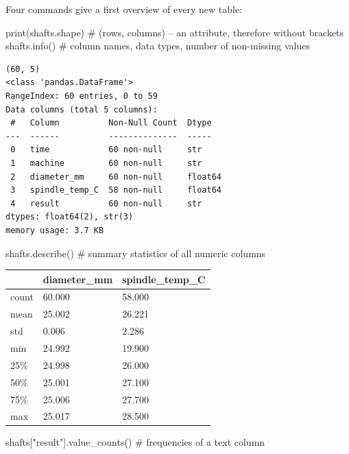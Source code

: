 \documentclass[
  letterpaper,
  DIV=11,
  numbers=noendperiod]{scrreprt}
\newenvironment{Shaded}{\begin{snugshade}}{\end{snugshade}}
\newcommand{\BuiltInTok}[1]{\textcolor[rgb]{0.00,0.23,0.31}{#1}}
\newcommand{\CommentTok}[1]{\textcolor[rgb]{0.37,0.37,0.37}{#1}}
\newcommand{\NormalTok}[1]{\textcolor[rgb]{0.00,0.23,0.31}{#1}}
\newcommand{\StringTok}[1]{\textcolor[rgb]{0.13,0.47,0.30}{#1}}
\begin{document}
Four commands give a first overview of every new table:

\begin{Shaded}
\begin{Highlighting}[]
\BuiltInTok{print}\NormalTok{(shafts.shape)      }\CommentTok{\# (rows, columns) – an attribute, therefore without brackets}
\NormalTok{shafts.info()            }\CommentTok{\# column names, data types, number of non{-}missing values}
\end{Highlighting}
\end{Shaded}

\begin{verbatim}
(60, 5)
<class 'pandas.DataFrame'>
RangeIndex: 60 entries, 0 to 59
Data columns (total 5 columns):
 #   Column          Non-Null Count  Dtype  
---  ------          --------------  -----  
 0   time            60 non-null     str    
 1   machine         60 non-null     str    
 2   diameter_mm     60 non-null     float64
 3   spindle_temp_C  58 non-null     float64
 4   result          60 non-null     str    
dtypes: float64(2), str(3)
memory usage: 3.7 KB
\end{verbatim}

\begin{Shaded}
\begin{Highlighting}[]
\NormalTok{shafts.describe()        }\CommentTok{\# summary statistics of all numeric columns}
\end{Highlighting}
\end{Shaded}

\begin{longtable}[]{@{}lll@{}}
\toprule\noalign{}
& diameter\_mm & spindle\_temp\_C \\
\midrule\noalign{}
\endhead
\bottomrule\noalign{}
\endlastfoot
count & 60.000 & 58.000 \\
mean & 25.002 & 26.221 \\
std & 0.006 & 2.286 \\
min & 24.992 & 19.900 \\
25\% & 24.998 & 26.000 \\
50\% & 25.001 & 27.100 \\
75\% & 25.006 & 27.700 \\
max & 25.017 & 28.500 \\
\end{longtable}

\begin{Shaded}
\begin{Highlighting}[]
\NormalTok{shafts[}\StringTok{"result"}\NormalTok{].value\_counts()      }\CommentTok{\# frequencies of a text column}
\end{Highlighting}
\end{Shaded}
\end{document}
